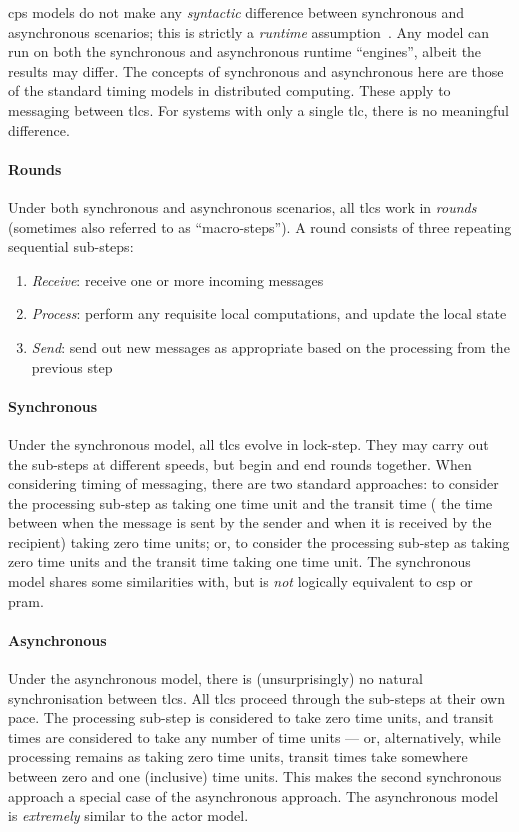 \gls{cps} models do not make any \emph{syntactic} difference between synchronous and asynchronous scenarios;
this is strictly a \emph{runtime} assumption~\cite{Nicolescu2012}.
Any model can run on both the synchronous and asynchronous runtime ``engines'', albeit the results may differ.
The concepts of synchronous and asynchronous here are those of the standard timing models in distributed computing.
These apply to messaging between \glspl{tlc}.  For systems with only a single \gls{tlc}, there is no meaningful difference.

\paragraph{Rounds}
Under both synchronous and asynchronous scenarios, all \glspl{tlc} work in \emph{rounds} (sometimes also referred to as ``macro-steps'').  A round consists of three repeating sequential sub-steps:
\begin{enumerate}
    \item \emph{Receive}:  receive one or more incoming messages
    \item \emph{Process}:  perform any requisite local computations, and update the local state
    \item \emph{Send}:  send out new messages as appropriate based on the processing from the previous step
\end{enumerate}

\paragraph{Synchronous}
Under the synchronous model, all \glspl{tlc} evolve in lock-step.  They may carry out the sub-steps at different speeds, but begin and end rounds together.  When considering timing of messaging, there are two standard approaches:  to consider the processing sub-step as taking one time unit and the transit time (\ie{} the time between when the message is sent by the sender and when it is received by the recipient) taking zero time units; or, to consider the processing sub-step as taking zero time units and the transit time taking one time unit.  The synchronous model shares some similarities with, but is \emph{not} logically equivalent to \gls{csp} or \gls{pram}.

\paragraph{Asynchronous}
Under the asynchronous model, there is (unsurprisingly) no natural synchronisation between \glspl{tlc}.  All \glspl{tlc} proceed through the sub-steps at their own pace.  The processing sub-step is considered to take zero time units, and transit times are considered to take any number of time units --- or, alternatively, while processing remains as taking zero time units, transit times take somewhere between zero and one (inclusive) time units.  This makes the second synchronous approach a special case of the asynchronous approach.  The asynchronous model is \emph{extremely} similar to the \gls{actor} model.

